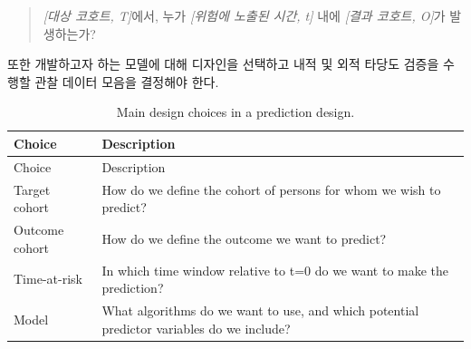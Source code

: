 \documentclass[10.5pt]{book}
\theoremstyle{definition}
\theoremstyle{definition}
\theoremstyle{definition}
\theoremstyle{remark}
\begin{document}
\begin{quote}
\emph{{[}대상 코호트, T{]}}에서, 누가 \emph{{[}위험에 노출된 시간, t{]}}
내에 \emph{{[}결과 코호트, O{]}}가 발생하는가?
\end{quote}

또한 개발하고자 하는 모델에 대해 디자인을 선택하고 내적 및 외적 타당도
검증을 수행할 관찰 데이터 모음을 결정해야 한다.

\begin{longtable}[]{@{}ll@{}}
\caption{\label{tab:plpDesign} Main design choices in a prediction
design.}\tabularnewline
\toprule
\begin{minipage}[b]{0.23\columnwidth}\raggedright\strut
Choice\strut
\end{minipage} & \begin{minipage}[b]{0.71\columnwidth}\raggedright\strut
Description\strut
\end{minipage}\tabularnewline
\midrule
\endfirsthead
\toprule
\begin{minipage}[b]{0.23\columnwidth}\raggedright\strut
Choice\strut
\end{minipage} & \begin{minipage}[b]{0.71\columnwidth}\raggedright\strut
Description\strut
\end{minipage}\tabularnewline
\midrule
\endhead
\begin{minipage}[t]{0.23\columnwidth}\raggedright\strut
Target cohort\strut
\end{minipage} & \begin{minipage}[t]{0.71\columnwidth}\raggedright\strut
How do we define the cohort of persons for whom we wish to
predict?\strut
\end{minipage}\tabularnewline
\begin{minipage}[t]{0.23\columnwidth}\raggedright\strut
Outcome cohort\strut
\end{minipage} & \begin{minipage}[t]{0.71\columnwidth}\raggedright\strut
How do we define the outcome we want to predict?\strut
\end{minipage}\tabularnewline
\begin{minipage}[t]{0.23\columnwidth}\raggedright\strut
Time-at-risk\strut
\end{minipage} & \begin{minipage}[t]{0.71\columnwidth}\raggedright\strut
In which time window relative to t=0 do we want to make the
prediction?\strut
\end{minipage}\tabularnewline
\begin{minipage}[t]{0.23\columnwidth}\raggedright\strut
Model\strut
\end{minipage} & \begin{minipage}[t]{0.71\columnwidth}\raggedright\strut
What algorithms do we want to use, and which potential predictor
variables do we include?\strut
\end{minipage}\tabularnewline
\bottomrule
\end{longtable}
\end{document}
